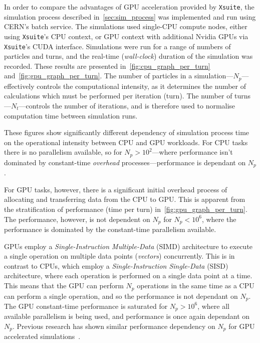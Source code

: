 \documentclass[11pt]{report}
\begin{document}
In order to compare the advantages of GPU acceleration provided by \verb|Xsuite|, the simulation process described in~\autoref{sec:sim_process} was implemented and run using CERN's batch service. The simulations used single-CPU compute nodes, either using \verb|Xsuite|'s CPU context, or GPU context with additional Nvidia GPUs via \verb|Xsuite|'s CUDA interface. Simulations were run for a range of numbers of particles and turns, and the real-time (\textit{wall-clock}) duration of the simulation was recorded. These results are presented in~\autoref{fig:cpu_graph_per_turn} and~\autoref{fig:gpu_graph_per_turn}. The number of particles in a simulation---$N_p$---effectively controls the computational intensity, as it determines the number of calculations which must be performed per iteration (turn). The number of turns---$N_t$---controls the number of iterations, and is therefore used to normalise computation time between simulation runs.

These figures show significantly different dependency of simulation process time on the operational intensity between CPU and GPU workloads. For CPU tasks there is no parallelism available, so for $N_p>10^2$---where performance isn't dominated by constant-time \textit{overhead} processes---performance is dependant on $N_p$.

For GPU tasks, however, there is a significant initial overhead process of allocating and transferring data from the CPU to GPU. This is apparent from the stratification of performance (time per turn) in~\autoref{fig:gpu_graph_per_turn}. The performance, however, is not dependent on $N_p$ for $N_p<10^6$, where the performance is dominated by the constant-time parallelism available.

GPUs employ a \textit{Single-Instruction Multiple-Data} (SIMD) architecture to execute a single operation on multiple data points (\textit{vectors}) concurrently. This is in contrast to CPUs, which employ a \textit{Single-Instruction Single-Data} (SISD) architecture, where each operation is performed on a single data point at a time. This means that the GPU can perform $N_p$ operations in the same time as a CPU can perform a single operation, and so the performance is not dependant on $N_p$. The GPU constant-time performance is saturated for $N_p>10^6$, where all available parallelism is being used, and performance is once again dependant on $N_p$. Previous research has shown similar performance dependency on $N_p$ for GPU accelerated simulations~\cite{Hegglin:2239398}.
\end{document}
